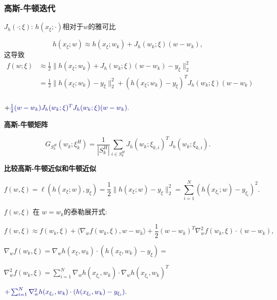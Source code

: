 \documentclass[handout]{beamer}
\begin{document}
\begin{frame}[allowframebreaks]
\frametitle{高斯-牛顿迭代}


 $J_h(\cdot;\xi)$:  $h(x_{\xi}; \cdot)$相对于$w$的雅可比

$$
    h(x_{\xi};w) \approx h(x_{\xi};w_k) + J_h(w_k;\xi)(w-w_k),
$$
这导致
$$
    \begin{aligned}
        f(w;\xi) & \approx \frac{1}{2} \| h(x_{\xi};w_k) + J_h(w_k;\xi)(w-w_k) - y_{\xi}^{}\|_2^2 \\
            & =  \frac{1}{2} \| h(x_{\xi};w_k)- y_{\xi}^{}\|_2^2 +    (h(x_{\xi};w_k)- y_{\xi}^{})_{}^{T} J_h(w_k;\xi)(w-w_k)\\
    \end{aligned}
$$

\begin{flushright}
  $ +     \dblue{  \frac{1}{2}(w-w_k) J_h(w_k;\xi)^{T}  J_h(w_k;\xi)(w-w_k)}.$
\end{flushright}

\bigskip
\textbf{高斯-牛顿矩阵}

 \begin{equation}\label{EQ_6_15}
G_{S_k^H}(w_k; \xi_k^H) = \frac{1}{|S_k^H|} \sum_{i\in S_k^H} J_h(w_k;\xi_{k,i})^{T}  J_h(w_k;\xi_{k,i}).
\end{equation}

\breakframe

\textbf{比较高斯-牛顿近似和牛顿近似}


$$   f(w,\xi) = \ell(h(x_{\xi};w),y_{\xi}) = \frac{1}{2} \|h(x_{\xi};w) - y_{\xi}\|_2^2 = \sum_{i=1}^N (h(x_{\xi_i};w) - y_{\xi_i})^2.
 $$

$f(w,\xi)$ 在 $w = w_k$的泰勒展开式:

\begin{small}
    $$    f(w,\xi) \approx
        f(w_k,\xi) + \langle \nabla_w f(w_k,\xi), w-w_k\rangle
            + \frac{1}{2} (w-w_k)^T \nabla_w^2 f(w_k,\xi)\cdot(w-w_k),  $$
\end{small}
\bigskip

$    \nabla_w f(w_k,\xi) =     \nabla_w h(x_{\xi},w_k) \cdot ( h(x_{\xi},w_k)-y_{\xi})= $


$  \nabla_w^2 f(w_k,\xi)=\sum_{i=1}^N\nabla_w h(x_{\xi_i},w_k) \cdot \nabla_w h(x_{\xi_i},w_k)^T$
\begin{flushright}
  $\dblue{ + \sum_{i=1}^N \nabla_w^2 h(x_{\xi_i},w_k)  \cdot (h(x_{\xi_i},w_k)-y_{\xi_i}).} $
\end{flushright}


\end{frame}
\end{document}
